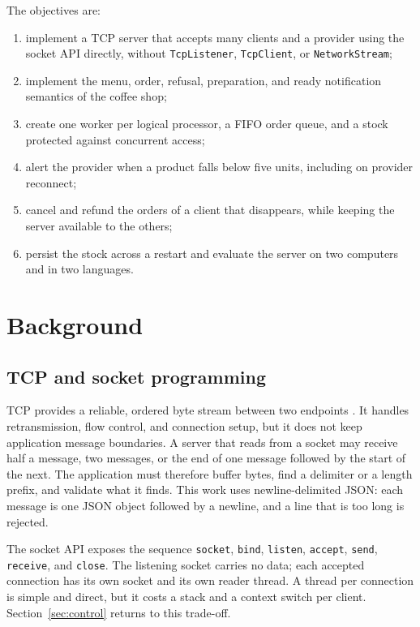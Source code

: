 \documentclass[12pt,a4paper]{article}
\begin{document}
The objectives are:
\begin{enumerate}[itemsep=1pt]
    \item implement a TCP server that accepts many clients and a provider using
          the socket API directly, without \texttt{TcpListener}, \texttt{TcpClient},
          or \texttt{NetworkStream};
    \item implement the menu, order, refusal, preparation, and ready notification
          semantics of the coffee shop;
    \item create one worker per logical processor, a FIFO order queue, and a stock
          protected against concurrent access;
    \item alert the provider when a product falls below five units, including on
          provider reconnect;
    \item cancel and refund the orders of a client that disappears, while keeping
          the server available to the others;
    \item persist the stock across a restart and evaluate the server on two
          computers and in two languages.
\end{enumerate}

\section{Background}
\label{sec:background}

\subsection{TCP and socket programming}

TCP provides a reliable, ordered byte stream between two endpoints
. It handles retransmission, flow control, and connection setup,
but it does not keep application message boundaries. A server that reads from a
socket may receive half a message, two messages, or the end of one message
followed by the start of the next. The application must therefore buffer bytes,
find a delimiter or a length prefix, and validate what it finds. This work uses
newline-delimited JSON: each message is one JSON object followed by a newline,
and a line that is too long is rejected.

The socket API exposes the sequence \texttt{socket}, \texttt{bind},
\texttt{listen}, \texttt{accept}, \texttt{send}, \texttt{receive}, and
\texttt{close}. The listening socket carries no data; each accepted connection has
its own socket and its own reader thread. A thread per connection is simple and
direct, but it costs a stack and a context switch per client. Section~\ref{sec:control}
returns to this trade-off.
\end{document}
